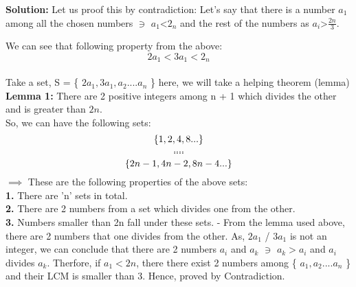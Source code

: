 \documentclass{article}
\begin{document}
\begin{flushleft}
\newcommand\tab[1][1cm]{\hspace*{#1}}
\textbf{Solution:} Let us proof this by contradiction:
\newline
\newline
 Let's say that there is a number $a_{1}$ among all the chosen numbers \(\ni\) $ a_{1}$\textless \( 2_{n}\) and the rest of the numbers as $a_{i}$\textgreater \(\frac{2n}{3}\).

We can see that following property from the above:
\[ 2a_{1} < 3a_{1} < 2_{n}\]\\
Take a set, S = \small\{ $2a_{1}, 3a_{1}, a_{2} .... a_{n}$ \small\}
\newline
here, we will take a helping theorem (lemma) \\
\textbf{Lemma 1: }There are 2 positive integers among n + 1 which divides the other and is greater than $2n$.\\
So, we can have the following sets:
\[ \small\{ 1, 2, 4, 8 ...\small\}\]
\[....\]
\[....\]
\[\small\{2n-1, 4n-2, 8n-4 ...\small\}\]
$\implies$ These are the following properties of the above sets:\\
\textbf{1.} There are 'n' sets in total.\\
\textbf{2. }There are 2 numbers from a set which divides one from the other.\\
\textbf{3. }Numbers smaller than 2n fall under these sets.
\newline
- From the lemma used above, there are 2 numbers that one divides from the other. As, $2a_{1}$
/ $3a_{1}$ is not an integer, we can conclude that there are 2 numbers $a_{i}$ and $a_{k}$ \(\ni\) $a_{k} > a_{i}$ and $a_{i}$ divides $a_{k}$.
\newline
Therfore, if $a_{1} < 2n$, there there exist 2 numbers among \small\{ $a_{1}, a_{2}....a_{n}$ \small\} and their LCM is smaller than 3.
Hence, proved by Contradiction.


\end{flushleft}
\end{document}
